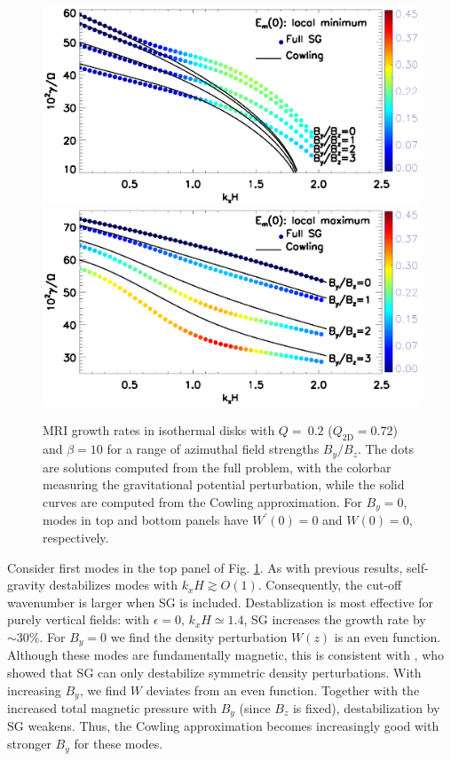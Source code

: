 \begin{figure}
  \includegraphics[width=\linewidth,clip=true,trim=0cm 2cm 0cm
    0cm]{figures/compare_growth3_tilted_even.ps}  
  \includegraphics[width=\linewidth,clip=true,trim=0cm 0cm 0cm
    0.52cm]{figures/compare_growth3_tilted_odd.ps} 
  \caption{MRI growth rates in isothermal disks with $Q=~0.2$ ($Q_\mathrm{2D}=0.72$) and 
    $\beta=10$ for a range of azimuthal field strengths $B_y/B_z$. The
    dots are solutions computed from the full problem, with the
    colorbar measuring the gravitational potential perturbation, while
    the solid curves are computed from the Cowling approximation. 
    For $B_y=0$, modes in top and bottom panels have
    $W^\prime(0)=0$ and $W(0)=0$, respectively.
    \label{compare_growth3_tilted}}
\end{figure}


Consider first modes in the top panel of 
Fig. \ref{compare_growth3_tilted}. As with previous results,  
self-gravity destabilizes modes with  $k_xH\gtrsim O(1)$. Consequently, the
cut-off wavenumber is larger when SG is included. 
Destablization is most effective for purely vertical fields: with
$\epsilon=0,\, k_xH\simeq 1.4$, SG increases the growth rate by $\sim
30\%$. For $B_y=0$ we find the density perturbation $W(z)$ is an even
function. Although these modes are fundamentally magnetic, this is consistent with
\cite{goldreich65a}, who showed that SG can only destabilize 
symmetric density perturbations.  
With increasing $B_y$, we find $W$ deviates from an even
function. 
Together with the increased total magnetic pressure with 
$B_y$ (since $B_z$ is fixed), destabilization by SG weakens. 
Thus, the Cowling approximation becomes increasingly good with stronger
$B_y$ for these modes. 


